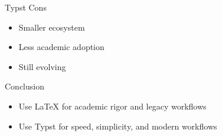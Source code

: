 \documentclass{beamer}
\begin{document}
\begin{frame}{Typst Cons}
\begin{itemize}
  \item Smaller ecosystem
  \item Less academic adoption
  \item Still evolving
\end{itemize}
\end{frame}

\begin{frame}{Conclusion}
\begin{itemize}
  \item Use LaTeX for academic rigor and legacy workflows
  \item Use Typst for speed, simplicity, and modern workflows
\end{itemize}
\end{frame}
\end{document}

